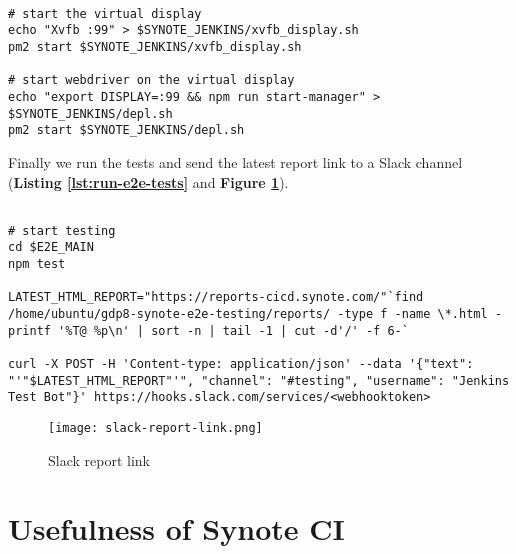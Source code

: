 \begin{listing}[H]
\begin{verbatim}

# start the virtual display
echo "Xvfb :99" > $SYNOTE_JENKINS/xvfb_display.sh
pm2 start $SYNOTE_JENKINS/xvfb_display.sh

# start webdriver on the virtual display
echo "export DISPLAY=:99 && npm run start-manager" > $SYNOTE_JENKINS/depl.sh
pm2 start $SYNOTE_JENKINS/depl.sh

\end{verbatim}
\label{lst:webdriver-pm2}
\end{listing}

Finally we run the tests and send the latest report link to a Slack channel (\textbf{Listing \ref{lst:run-e2e-tests}} and \textbf{Figure \ref{fig:slack-report-link}}).\\

\begin{listing}[H]
\begin{verbatim}

# start testing
cd $E2E_MAIN
npm test

LATEST_HTML_REPORT="https://reports-cicd.synote.com/"`find /home/ubuntu/gdp8-synote-e2e-testing/reports/ -type f -name \*.html -printf '%T@ %p\n' | sort -n | tail -1 | cut -d'/' -f 6-`

curl -X POST -H 'Content-type: application/json' --data '{"text": "'"$LATEST_HTML_REPORT"'", "channel": "#testing", "username": "Jenkins Test Bot"}' https://hooks.slack.com/services/<webhooktoken>

\end{verbatim}
\label{lst:run-e2e-tests}
\end{listing}

\begin{figure}[!hbt]
  	\centering
 	\texttt{[image: slack-report-link.png]}
  	\caption{Slack report link}
 	\label{fig:slack-report-link}
\end{figure}

\section{Usefulness of Synote CI}
\label{sec:usefulness-of-synote-ci}

